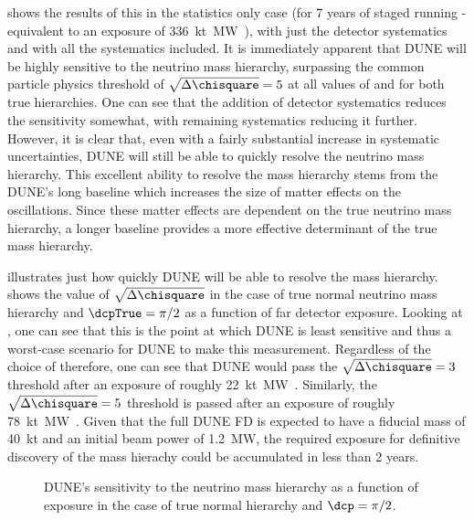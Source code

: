  shows the results of this in the statistics only case (for 7 years of staged running - equivalent to an exposure of \SI{336}{\kilo\tonne\mega\watt\year}), with just the detector systematics and with all the systematics included.
It is immediately apparent that DUNE will be highly sensitive to the neutrino mass hierarchy, surpassing the common particle physics threshold of $\sqrt{\Delta \chisquare} = 5$ at all values of \dcp and for both true hierarchies.
One can see that the addition of detector systematics reduces the sensitivity somewhat, with remaining systematics reducing it further.
However, it is clear that, even with a fairly substantial increase in systematic uncertainties, DUNE will still be able to quickly resolve the neutrino mass hierarchy.
This excellent ability to resolve the mass hierarchy stems from the DUNE's long baseline which increases the size of matter effects on the oscillations. 
Since these matter effects are dependent on the true neutrino mass hierarchy, a longer baseline provides a more effective determinant of the true mass hierarchy.

 illustrates just how quickly DUNE will be able to resolve the mass hierarchy.
 shows the value of $\sqrt{\Delta\chisquare}$ in the case of true normal neutrino mass hierarchy and $\dcpTrue = \pi/2$ as a function of far detector exposure. 
Looking at , one can see that this is the point at which DUNE is least sensitive and thus a worst-case scenario for DUNE to make this measurement.
Regardless of the choice of \dcp therefore, one can see that DUNE would pass the $\sqrt{\Delta\chisquare}=3$ threshold after an exposure of roughly \SI{22}{\kilo\tonne\mega\watt\year}.
Similarly, the $\sqrt{\Delta\chisquare}=5$ threshold is passed after an exposure of roughly \SI{78}{\kilo\tonne\mega\watt\year}.
Given that the full DUNE FD is expected to have a fiducial mass of \SI{40}{\kilo\tonne} and an initial beam power of \SI{1.2}{\mega\watt}, the required exposure for definitive discovery of the mass hierachy could be accumulated in less than 2 years.

\begin{figure}[h]
	\begin{adjustbox}{max totalsize=.6\linewidth, center}
		
	\end{adjustbox}
	\caption[DUNE's sensitivity to the neutrino mass hierarchy as a function of exposure]{DUNE's sensitivity to the neutrino mass hierarchy as a function of exposure in the case of true normal hierarchy and $\dcp=\pi/2$.}
	\label{fig:mhSensExp}
\end{figure}

